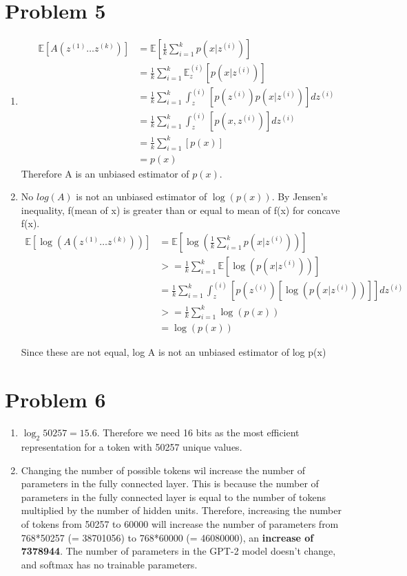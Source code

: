 \documentclass[12pt]{article}
\begin{document}
\section*{Problem 5}
\begin{enumerate}[label=(\arabic*)]
  \item 
\begin{align*}
  \mathbb{E}[A(z^{(1)} \dots z^{(k)})] &=\mathbb{E}[\frac{1}{k} \sum_{i=1}^{k} p(x | z^{(i)})] \\
  &= \frac{1}{k} \sum_{i=1}^{k} \mathbb{E}_z^{(i)} [p(x | z^{(i)})] \\
  &= \frac{1}{k} \sum_{i=1}^{k} \int_z^{(i)}[p(z^{(i)}) p(x | z^{(i)})] dz^{(i)} \\
  &= \frac{1}{k} \sum_{i=1}^{k} \int_z^{(i)}[p(x, z^{(i)})] dz^{(i)} \\
  &= \frac{1}{k} \sum_{i=1}^{k} [p(x)] \\
  &= p(x)  
\end{align*}
Therefore A is an unbiased estimator of $p(x)$.

\item  
No $log(A)$ is not an unbiased estimator of $\log(p(x))$. 
By Jensen's inequality, f(mean of x) is greater than or equal to mean of f(x) for concave f(x).
\\
\begin{align*}
  \mathbb{E}[\log(A(z^{(1)} \dots z^{(k)}))] &=\mathbb{E}[\log(\frac{1}{k} \sum_{i=1}^{k} p(x | z^{(i)}))] \\
  &>= \frac{1}{k} \sum_{i=1}^{k}  \mathbb{E}[\log( p(x | z^{(i)}))] \\
  &= \frac{1}{k} \sum_{i=1}^{k}  \int_z^{(i)}[p(z^{(i)})[\log( p(x | z^{(i)}))]] dz^{(i)} \\
  &>= \frac{1}{k} \sum_{i=1}^{k} \log(p(x)) \\
  &= \log(p(x)) 
\end{align*}

Since these are not equal, log A is not an unbiased estimator of log p(x)
\end{enumerate}

\section*{Problem 6}

\begin{enumerate}[label=(\arabic*)]
  \item $ \log_2 50257 = 15.6 $. Therefore we need 16 bits as the most efficient 
  representation for a token with 50257 unique values.
  
  \item Changing the number of possible tokens wil increase the number of 
  parameters in the fully connected layer. This is because the number of 
  parameters in the fully connected layer is equal to the number of tokens
  multiplied by the number of hidden units. Therefore, increasing the number of
  tokens from 50257 to 60000 will increase the number of parameters from 
  768*50257 (= 38701056) to 768*60000 (= 46080000), an \textbf{increase of 7378944}.
  The number of parameters in the GPT-2 model doesn't change, and softmax 
  has no trainable parameters.

\end{enumerate}
\end{document}
